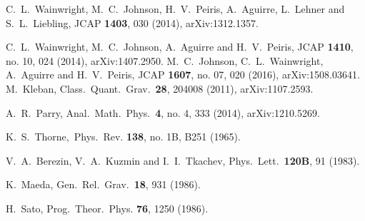   C.~L.~Wainwright, M.~C.~Johnson, H.~V.~Peiris, A.~Aguirre, L.~Lehner and S.~L.~Liebling,
  JCAP {\bf 1403}, 030 (2014), 
  arXiv:1312.1357.

  C.~L.~Wainwright, M.~C.~Johnson, A.~Aguirre and H.~V.~Peiris,
  JCAP {\bf 1410}, no. 10, 024 (2014), 
 arXiv:1407.2950.
  M.~C.~Johnson, C.~L.~Wainwright, A.~Aguirre and H.~V.~Peiris,
  JCAP {\bf 1607}, no. 07, 020 (2016), 
  arXiv:1508.03641.
  M.~Kleban,
  Class.\ Quant.\ Grav.\  {\bf 28}, 204008 (2011), 
  arXiv:1107.2593.

  A.~R.~Parry,
  Anal.\ Math.\ Phys.\  {\bf 4}, no. 4, 333 (2014), 
  arXiv:1210.5269.

  K.~S.~Thorne,\ 
  Phys.\ Rev.  {\bf 138}, no. 1B, B251 (1965). 


  V.~A.~Berezin, V.~A.~Kuzmin and I.~I.~Tkachev,
  Phys.\ Lett.\  {\bf 120B}, 91 (1983).

  K.~Maeda,
  Gen.\ Rel.\ Grav.\  {\bf 18}, 931 (1986).

  H.~Sato,
  Prog.\ Theor.\ Phys. {\bf 76}, 1250 (1986).

